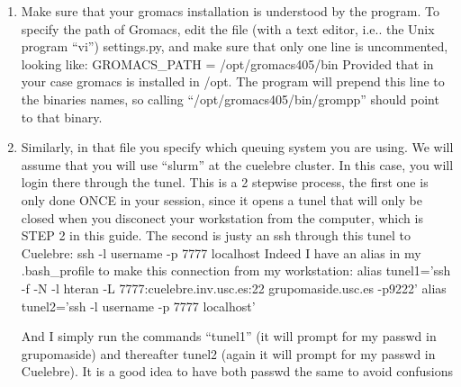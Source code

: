 \documentclass[10pt, oneside, pdftex]{article}
\begin{document}
\begin{enumerate}
\item{Make sure  that your  gromacs installation  is understood  by the
program. To  specify the path of  Gromacs, edit the file  (with a text
editor, i.e.. the  Unix program ``vi'') settings.py, and  make sure that
only   one  line   is  uncommented,   looking  like:   GROMACS\_PATH  =
/opt/gromacs405/bin Provided that in your case gromacs is installed in
/opt. The  program will  prepend this line  to the binaries  names, so
calling ``/opt/gromacs405/bin/grompp'' should point to that binary.}

\item{Similarly,  in that file you  specify which queuing  system you are
using.  We will  assume  that you  will  use ``slurm''  at the  cuelebre
cluster. In this case, you will login there through the tunel. This is
a 2 stepwise process, the first one is only done ONCE in your session,
since it  opens a tunel  that will only  be closed when  you disconect
your workstation from the computer, which is STEP 2 in this guide. The
second is justy an ssh through this tunel to Cuelebre: ssh -l username
-p 7777 localhost  Indeed I have an alias in  my .bash\_profile to make
this connection from my workstation: alias tunel1='ssh -f -N -l hteran
-L   7777:cuelebre.inv.usc.es:22   grupomaside.usc.es  -p9222'   alias
tunel2='ssh -l username -p 7777 localhost'

And I simply  run the commands ``tunel1'' (it will  prompt for my passwd
in grupomaside)  and thereafter  tunel2 (again it  will prompt  for my
passwd in Cuelebre). It is a good idea to have both passwd the same to
avoid confusions}
\end{enumerate}
\end{document}
